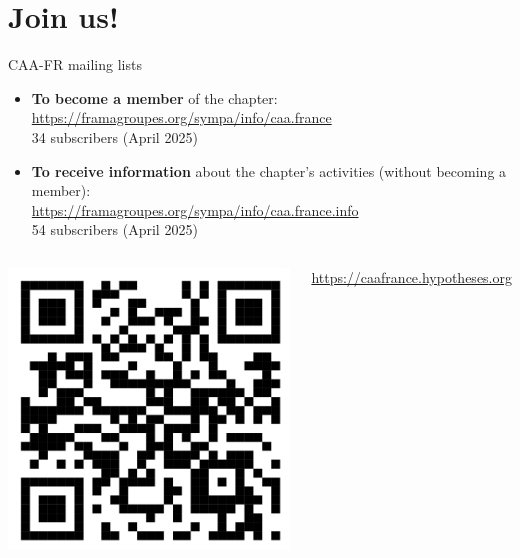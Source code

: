 \documentclass[xcolor=dvipsnames, 10pt, french, american]{beamer}
\begin{document}
\section{Join us!}
\frame{\tableofcontents[sectionstyle=show/shaded, subsectionstyle=show/hide/hide]}
 
 
\begin{frame}
	\begin{block}{CAA-FR mailing lists}
		\begin{itemize}
			\item \textbf{To become a member} of the chapter: \\
                \url{https://framagroupes.org/sympa/info/caa.france}\\
                 34 subscribers (April 2025)
			\item \textbf{To receive information} about the chapter's activities (without becoming a member):\\ 
                \url{https://framagroupes.org/sympa/info/caa.france.info}\\
                  54 subscribers (April 2025)
		\end{itemize}
	\end{block}\medskip
    
     \begin{columns}[t]
            \centering
            \includegraphics[height=0.2\textheight]{figures/CAA-Fr_QR-Code-05}\hfill
            
            \footnotesize\url{https://caafrance.hypotheses.org}
    	

\end{columns}
\end{frame}
\end{document}
